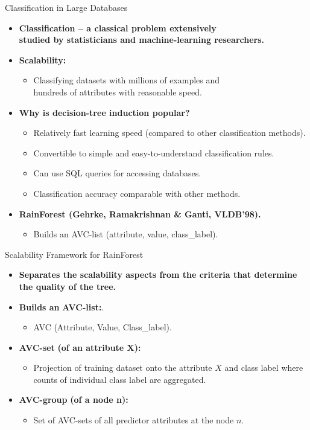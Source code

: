 \begin{frame}{Classification in Large Databases}
  \begin{itemize}
  \item \textbf{Classification -- a classical problem extensively \\ studied by statisticians and machine-learning researchers.}
  \item \textbf{Scalability:}
    \begin{itemize}
    \item Classifying datasets with millions of examples and \\ hundreds of attributes with reasonable speed.
    \end{itemize}
  \item \textbf{Why is decision-tree induction popular?}
    \begin{itemize}
    \item Relatively fast learning speed (compared to other classification methods).
    \item Convertible to simple and easy-to-understand classification rules.
    \item Can use SQL queries for accessing databases.
    \item Classification accuracy comparable with other methods.
    \end{itemize}
  \item \textbf{RainForest (Gehrke, Ramakrishnan \& Ganti, VLDB'98).}
    \begin{itemize}
    \item Builds an AVC-list (attribute, value, class\_label).
    \end{itemize}
  \end{itemize}
\end{frame}

\begin{frame}{Scalability Framework for RainForest}
  \begin{itemize}
  \item \textbf{Separates the scalability aspects from the criteria that determine the quality of the tree.}
  \item \textbf{Builds an} \textbf{\color{airforceblue}AVC-list:}.
    \begin{itemize}
    \item AVC (Attribute, Value, Class\_label).
    \end{itemize}
  \item \textbf{\color{airforceblue}AVC-set} \textbf{(of an attribute X):}
    \begin{itemize}
    \item Projection of training dataset onto the attribute $X$ and class label where counts of individual class label are aggregated.
    \end{itemize}
  \item \textbf{\color{airforceblue}AVC-group} \textbf{(of a node n):}
    \begin{itemize}
    \item Set of AVC-sets of all predictor attributes at the node $n$.
    \end{itemize}
  \end{itemize}
\end{frame}

